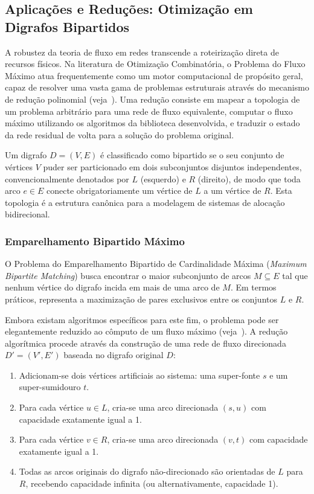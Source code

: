 \documentclass[12pt,a4paper]{article}
\begin{document}
\subsection{Aplicações e Reduções: Otimização em Digrafos Bipartidos}

A robustez da teoria de fluxo em redes transcende a roteirização direta de recursos físicos. Na literatura de Otimização Combinatória, o Problema do Fluxo Máximo atua frequentemente como um motor computacional de propósito geral, capaz de resolver uma vasta gama de problemas estruturais através do mecanismo de redução polinomial (veja~\cite{cook1998combinatorial}). Uma redução consiste em mapear a topologia de um problema arbitrário para uma rede de fluxo equivalente, computar o fluxo máximo utilizando os algoritmos da biblioteca desenvolvida, e traduzir o estado da rede residual de volta para a solução do problema original.

Um digrafo $D = (V, E)$ é classificado como bipartido se o seu conjunto de vértices $V$ puder ser particionado em dois subconjuntos disjuntos independentes, convencionalmente denotados por $L$ (esquerdo) e $R$ (direito), de modo que toda arco $e \in E$ conecte obrigatoriamente um vértice de $L$ a um vértice de $R$. Esta topologia é a estrutura canônica para a modelagem de sistemas de alocação bidirecional.

\subsubsection{Emparelhamento Bipartido Máximo}

O Problema do Emparelhamento Bipartido de Cardinalidade Máxima (\textit{Maximum Bipartite Matching}) busca encontrar o maior subconjunto de arcos $M \subseteq E$ tal que nenhum vértice do digrafo incida em mais de uma arco de $M$. Em termos práticos, representa a maximização de pares exclusivos entre os conjuntos $L$ e $R$.

Embora existam algoritmos específicos para este fim, o problema pode ser elegantemente reduzido ao cômputo de um fluxo máximo (veja~\cite{ahuja1993network}). A redução algorítmica procede através da construção de uma rede de fluxo direcionada $D' = (V', E')$ baseada no digrafo original $D$:
\begin{enumerate}
    \item Adicionam-se dois vértices artificiais ao sistema: uma super-fonte $s$ e um super-sumidouro $t$.
    \item Para cada vértice $u \in L$, cria-se uma arco direcionada $(s, u)$ com capacidade exatamente igual a 1.
    \item Para cada vértice $v \in R$, cria-se uma arco direcionada $(v, t)$ com capacidade exatamente igual a 1.
    \item Todas as arcos originais do digrafo não-direcionado são orientadas de $L$ para $R$, recebendo capacidade infinita (ou alternativamente, capacidade 1).
\end{enumerate}
\end{document}
